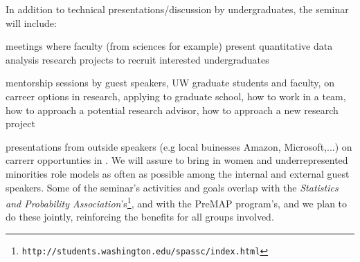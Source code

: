 In addition to technical presentations/discussion by undergraduates,
the seminar will include:
\bits
\item meetings where faculty (from sciences for example) present quantitative data analysis research projects to recruit interested undergraduates
\item  mentorship sessions by guest speakers, UW graduate students and faculty, on carreer options in research, applying to graduate school, how to work in a team, how to approach a potential research advisor, how to approach a new research project
\item presentations from outside speakers (e.g local buinesses Amazon,
  Microsoft,...) on carrerr opportunties in \cdse. We will assure to bring in women and underrepresented minorities role models as often as possible among the internal and external guest speakers.
\eits
Some of the seminar's activities and goals overlap with the {\em Statistics and Probability Association}'s\footnote{{\tt http://students.washington.edu/spassc/index.html}}, and with the PreMAP program's, and we plan to do these jointly, reinforcing the  benefits for all groups involved.


